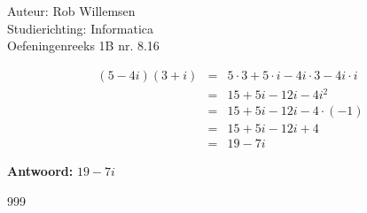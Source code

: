 \documentclass[a4paper]{article}
\begin{document}
\noindent \large Auteur: Rob Willemsen \\
\noindent \large Studierichting: Informatica\\
\noindent \large Oefeningenreeks 1B nr. 8.16\\

\medskip

\normalsize

\begin{eqnarray*}
  (5-4i)(3+i) & = & 5 \cdot 3 + 5 \cdot i - 4i \cdot 3 - 4i \cdot i \\
              & = & 15 + 5i - 12i - 4i^2 \\
              & = & 15 + 5i - 12i - 4 \cdot (-1) \\
              & = & 15 + 5i - 12i + 4 \\
              & = & 19 - 7i
\end{eqnarray*}

\textbf{Antwoord:} $19 - 7i$


\begin{thebibliography}{999}
\end{thebibliography}
\end{document}
